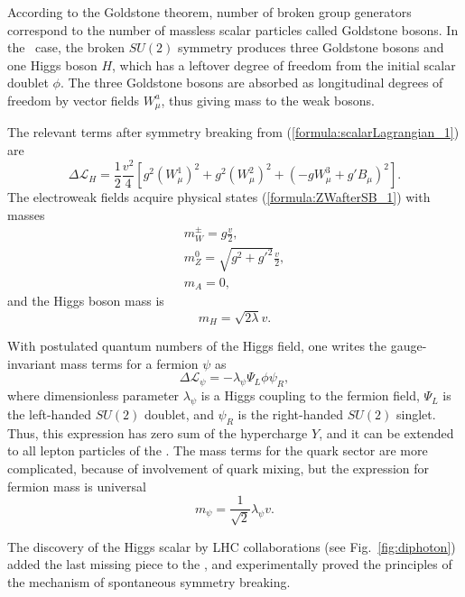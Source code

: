 According to the Goldstone theorem, number of broken group generators correspond to the number of massless scalar particles called Goldstone bosons. 
In the \sm\ case, the broken $SU(2)$ symmetry produces three Goldstone bosons and one Higgs boson $H$, which has a leftover degree of freedom from the initial scalar doublet $\phi$.
The three Goldstone bosons are absorbed as longitudinal degrees of freedom by vector fields $W^a_\mu$, thus giving mass to the weak bosons.

The relevant terms after symmetry breaking from (\ref{formula:scalarLagrangian_1}) are
\begin{equation}
	\Delta \mathcal{L}_{H} = \frac{1}{2} \frac{v^2}{4}[g^2 (W^1_\mu)^2 + g^2 (W^2_\mu)^2 + (-g W^3_\mu + g' B_\mu)^2].
\end{equation}
The electroweak fields acquire physical states (\ref{formula:ZWafterSB_1}) with masses
\begin{equation}
\begin{array}{l}
m_W^\pm = g\frac{v}{2},\\
m_Z^0 = \sqrt{g^2 + g'^2}\frac{v}{2},\\
m_A = 0,
\end{array}
\label{formula:ZWmassafterSB_1}
\end{equation}
and the Higgs boson mass is
\begin{equation}
m_H = \sqrt{2\lambda}v.
\end{equation}

With postulated quantum numbers of the Higgs field, one writes the gauge-invariant mass terms for a fermion $\psi$ as 
\begin{equation}
	\Delta \mathcal{L}_\psi = -\lambda_\psi \Psi_L \phi \psi_R,
\end{equation}
where dimensionless parameter $\lambda_\psi$ is a Higgs coupling to the fermion field, $\Psi_L$ is the left-handed $SU(2)$ doublet, and $\psi_R$ is the right-handed $SU(2)$ singlet. Thus, this expression has zero sum of the hypercharge $Y$, and it can be extended to all lepton particles of the \sm. The mass terms for the quark sector are more complicated, because of involvement of quark mixing, but the expression for fermion mass is universal
\begin{equation}
	m_\psi = \frac{1}{\sqrt{2}} \lambda_\psi v.
    \label{formula:fermionMass_1}
\end{equation}

The discovery of the Higgs scalar by LHC collaborations (see Fig.~\ref{fig:diphoton}) added the last missing piece to the \sm, and experimentally proved the principles of the mechanism of spontaneous symmetry breaking.

